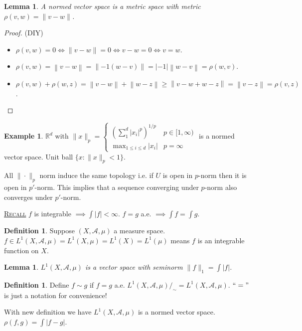 \documentclass{report}
\newcommand{\R}{\mathbb{R}}
\newcommand{\cA}{\mathcal{A}}
\newcommand{\norm}[1]{\left\| #1 \right\|}
\newcommand{\fancyem}[1]{\underline{\textsc{#1}}}
\newtheorem{lemma}[theorem]{Lemma}
\theoremstyle{definition}
\newtheorem{definition}[theorem]{Definition}
\newtheorem{example}[theorem]{Example}
\theoremstyle{remark}
\begin{document}
\begin{lemma}
	A normed vector space is a metric space with metric $\rho(v, w) = \|v - w\|$.
\end{lemma}
\begin{proof}{(DIY)}
	\begin{itemize}
		\item $\rho(v, w) = 0 \iff \|v - w\| = 0 \iff v - w = 0 \iff v = w$.
		\item $\rho(v, w) = \norm{v - w} = \norm{-1(w - v)} = |-1|\norm{w - v} = \rho(w, v)$.
		\item $\rho(v, w) + \rho(w, z) = \norm{v - w} + \norm{w - z} \geq \norm{v - w + w - z} = \norm{v - z} = \rho(v, z)$. \qedhere
	\end{itemize}
\end{proof}
\begin{example}
	$\R^d$ with $\|x\|_p = \begin{cases}
		\displaystyle \left(\sum_{1}^d |x_i|^p\right)^{1 / p} & p \in [1, \infty) \\
		\displaystyle \max_{1 \leq i \leq d} |x_i| & p = \infty
	\end{cases}$ is a normed vector space.
	Unit ball $\{x: \|x\|_p < 1\}$.
\end{example}
All $\|\cdot\|_p$ norm induce the same topology i.e. if $U$ is open in $p$-norm then it is open in $p'$-norm. This implies that a sequence converging under $p$-norm also converges under $p'$-norm.

\fancyem{Recall} $f$ is integrable $\implies \int|f| < \infty$. $f = g $ a.e. $\implies \int f = \int g$.

\begin{definition} 
	Suppose $(X, \cA, \mu)$ a measure space.\\
	$f \in L^1(X, \cA, \mu) = L^1(X, \mu) = L^1(X) = L^1(\mu)$ means $f$ is an integrable function on $X$.
\end{definition}

\begin{lemma}
	$L^1(X, \cA, \mu)$ is a vector space with seminorm $\|f\|_1 = \int |f|$.
\end{lemma}

\begin{definition}
	Define $f \sim g$ if $f = g$ a.e. 
	$L^1(X, \cA, \mu)/_\sim = L^1(X, \cA, \mu)$.
	$``="$ is just a notation for convenience!
\end{definition}

With new definition we have $L^1(X, \cA, \mu)$ is a normed vector space.
$\rho(f, g) = \int |f - g|$.
\end{document}
